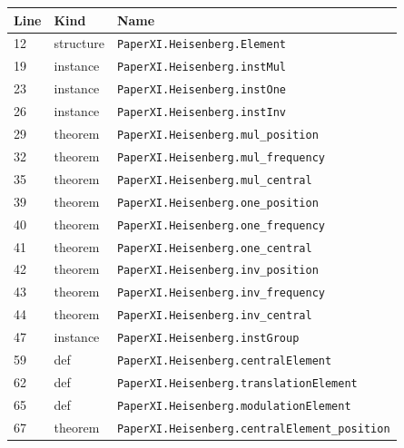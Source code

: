\documentclass[10pt,oneside]{book}
\begin{document}
\begin{longtable}{@{}p{}p{}p{}@{}}\toprule Line&Kind&Name\\\midrule\endhead

12&structure&\nolinkurl{PaperXI.Heisenberg.Element}\\

19&instance&\nolinkurl{PaperXI.Heisenberg.instMul}\\

23&instance&\nolinkurl{PaperXI.Heisenberg.instOne}\\

26&instance&\nolinkurl{PaperXI.Heisenberg.instInv}\\

29&theorem&\nolinkurl{PaperXI.Heisenberg.mul_position}\\

32&theorem&\nolinkurl{PaperXI.Heisenberg.mul_frequency}\\

35&theorem&\nolinkurl{PaperXI.Heisenberg.mul_central}\\

39&theorem&\nolinkurl{PaperXI.Heisenberg.one_position}\\

40&theorem&\nolinkurl{PaperXI.Heisenberg.one_frequency}\\

41&theorem&\nolinkurl{PaperXI.Heisenberg.one_central}\\

42&theorem&\nolinkurl{PaperXI.Heisenberg.inv_position}\\

43&theorem&\nolinkurl{PaperXI.Heisenberg.inv_frequency}\\

44&theorem&\nolinkurl{PaperXI.Heisenberg.inv_central}\\

47&instance&\nolinkurl{PaperXI.Heisenberg.instGroup}\\

59&def&\nolinkurl{PaperXI.Heisenberg.centralElement}\\

62&def&\nolinkurl{PaperXI.Heisenberg.translationElement}\\

65&def&\nolinkurl{PaperXI.Heisenberg.modulationElement}\\

67&theorem&\nolinkurl{PaperXI.Heisenberg.centralElement_position}\\


\end{longtable}
\end{document}
